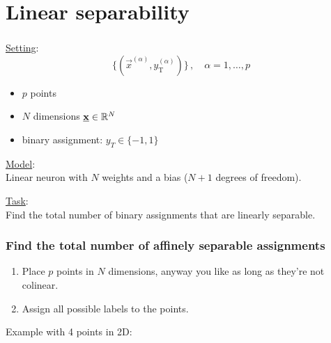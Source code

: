 \section{Linear separability}


\begin{frame}\frametitle{\secname}

\underline{Setting}:\\

\begin{equation*}
\Big\{ \left(\vec x^{(\alpha)}, y^{(\alpha)}_{\mathrm{T}} \right) \Big\}\,,\quad \alpha = 1,\ldots,p
\end{equation*}

\begin{itemize}
\item $p$ points
\item $N$ dimensions $\underline{\mathbf{x}} \in \mathbb{R}^N$
\item binary assignment: $y_T \in \{-1,1\}$
\end{itemize}

\pause

\underline{Model}:\\

Linear neuron with $N$ weights and a bias ($N+1$ degrees of freedom).

\pause

\underline{Task}:\\

Find the total number of binary assignments that are linearly separable.

\end{frame}

\begin{frame}\frametitle{Find the total number of affinely separable assignments}

\begin{enumerate}
\item Place $p$ points in $N$ dimensions, anyway you like as long as they're not colinear.
\item Assign all possible labels to the points.
\end{enumerate}

Example with 4 points in 2D:




\end{frame}

